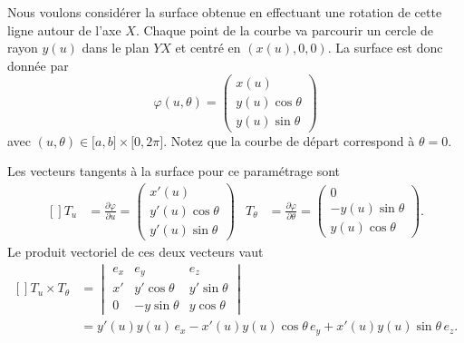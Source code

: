 Nous voulons considérer la surface obtenue en effectuant une rotation de cette ligne autour de l'axe \( X\). Chaque point de la courbe va parcourir un cercle de rayon \( y(u)\) dans le plan \( YX\) et centré en \( (x(u),0,0)\). La surface est donc donnée par
\begin{equation}
	\varphi(u,\theta)=\begin{pmatrix}
		x(u)           \\
		y(u)\cos\theta \\
		y(u)\sin\theta
	\end{pmatrix}
\end{equation}
avec \( (u,\theta)\in\mathopen[ a , b \mathclose]\times \mathopen[ 0 , 2\pi \mathclose]\). Notez que la courbe de départ correspond à \( \theta=0\).

Les vecteurs tangents à la surface pour ce paramétrage sont
\begin{equation}
	\begin{aligned}[]
		T_u        & =\frac{ \partial \varphi }{ \partial u }=\begin{pmatrix}
			                                                      x'(u)           \\
			                                                      y'(u)\cos\theta \\
			                                                      y'(u)\sin\theta
		                                                      \end{pmatrix}      &
		T_{\theta} & =\frac{ \partial \varphi }{ \partial \theta }=\begin{pmatrix}
			                                                           0               \\
			                                                           -y(u)\sin\theta \\
			                                                           y(u)\cos\theta
		                                                           \end{pmatrix}.
	\end{aligned}
\end{equation}
Le produit vectoriel de ces deux vecteurs vaut
\begin{equation}
	\begin{aligned}[]
		T_u\times T_{\theta} & =\begin{vmatrix}
			                        e_x & e_y          & e_z          \\
			                        x'  & y'\cos\theta & y'\sin\theta \\
			                        0   & -y\sin\theta & y\cos\theta
		                        \end{vmatrix}                                   \\
		                     & =y'(u)y(u)\,e_x-x'(u)y(u)\cos\theta\, e_y+x'(u)y(u)\sin\theta\, e_z.
	\end{aligned}
\end{equation}
